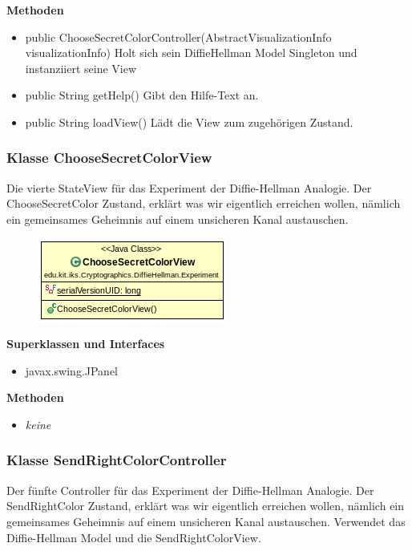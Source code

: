 \documentclass{article}
\begin{document}
      \textbf{Methoden}
      \begin{itemize}
          \item public ChooseSecretColorController(AbstractVisualizationInfo visualizationInfo) \newline
              Holt sich sein DiffieHellman Model Singleton und instanziiert seine View
        \item public String getHelp() \newline
        Gibt den Hilfe-Text an.
        \item public String loadView() \newline
        Lädt die View zum zugehörigen Zustand.
      \end{itemize}

\subsubsection{Klasse ChooseSecretColorView}
      Die vierte StateView für das Experiment der Diffie-Hellman Analogie.
      Der ChooseSecretColor Zustand, erklärt was wir eigentlich erreichen wollen,
      nämlich ein gemeinsames Geheimnis auf einem unsicheren Kanal austauschen.

      \begin{figure}[H]
        \centering
        \includegraphics{resources/edu-kit-iks-Cryptographics-DiffieHellman-Experiment-ChooseSecretColorView}
      \end{figure}

      \textbf{Superklassen und Interfaces}
      \begin{itemize}
        \item javax.swing.JPanel
      \end{itemize}

      \textbf{Methoden}
      \begin{itemize}
        \item \textit{keine}
      \end{itemize}

\subsubsection{Klasse SendRightColorController}
      Der fünfte Controller für das Experiment der Diffie-Hellman Analogie.
      Der SendRightColor Zustand, erklärt was wir eigentlich erreichen wollen,
      nämlich ein gemeinsames Geheimnis auf einem unsicheren Kanal austauschen.
      Verwendet das Diffie-Hellman Model und die SendRightColorView.
\end{document}
